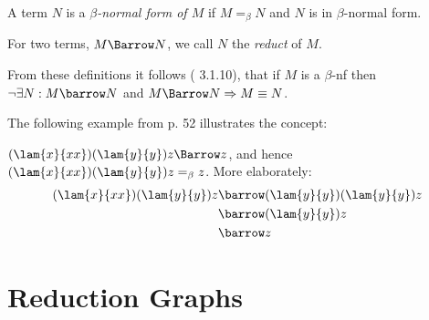 \begin{definition}
	A term $N$ is a \emph{$\beta$-normal form of $M$} if $M=_\beta N$ and $N$ is in $\beta$-normal form.
\end{definition}
\begin{definition}
	For two terms, $M\Barrow N$, we call $N$ the \emph{reduct} of $M$.
\end{definition}
From these definitions it follows (\cite{Barendregt} 3.1.10), that if $M$ is a
$\beta$-nf then $\neg\exists N:M\barrow N$ and $M\Barrow N\Rightarrow M\equiv N$.

The following example from \cite{Barendregt} p. 52 illustrates the concept:
\begin{example}
	$(\lam{x}{xx})(\lam{y}{y})z\Barrow z$, and hence $(\lam{x}{xx})(\lam{y}{y})z =_\beta z$.
	More elaborately:
\begin{align*}
	(\lam{x}{xx})(\lam{y}{y})z&\barrow(\lam{y}{y})(\lam{y}{y})z \\
	&\barrow(\lam{y}{y})z \\
	&\barrow z
\end{align*}
\end{example}


\section{Reduction Graphs}

